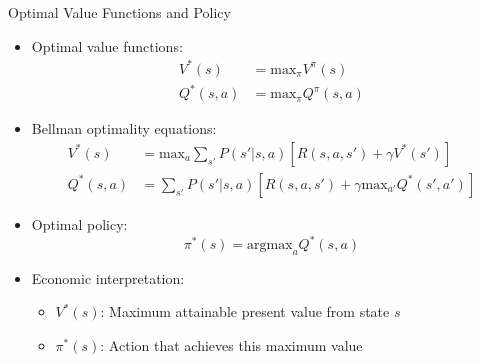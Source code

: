 \documentclass[10pt]{beamer}
\renewcommand{\max}{\text{max}}
\newcommand{\argmax}{\text{argmax}}
\begin{document}
\begin{frame}{Optimal Value Functions and Policy}
    \begin{itemize}
        \item Optimal value functions:
        \begin{align}
            V^*(s) &= \max_{\pi} V^{\pi}(s) \\
            Q^*(s,a) &= \max_{\pi} Q^{\pi}(s,a)
        \end{align}
        
        \item Bellman optimality equations:
        \begin{align}
            V^*(s) &= \max_a \sum_{s'} P(s'|s,a) \left[ R(s,a,s') + \gamma V^*(s') \right] \\
            Q^*(s,a) &= \sum_{s'} P(s'|s,a) \left[ R(s,a,s') + \gamma \max_{a'} Q^*(s',a') \right]
        \end{align}
        
        \item Optimal policy:
        \begin{equation}
            \pi^*(s) = \argmax_a Q^*(s,a)
        \end{equation}
        
        \item Economic interpretation:
        \begin{itemize}
            \item $V^*(s)$: Maximum attainable present value from state $s$
            \item $\pi^*(s)$: Action that achieves this maximum value
        \end{itemize}
    \end{itemize}
\end{frame}

\end{document}
